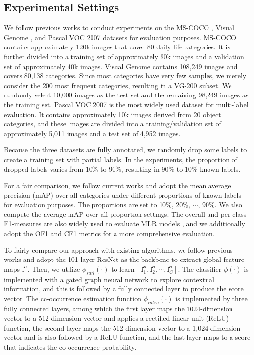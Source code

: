 \subsection{Experimental Settings}

\quad We follow previous works \cite{durand2019learning} to conduct experiments on the MS-COCO \cite{lin2014microsoft}, Visual Genome \cite{krishna2017visual}, and Pascal VOC 2007 \cite{everingham2010pascal} datasets for evaluation purposes. MS-COCO contains approximately 120k images that cover 80 daily life categories. It is further divided into a training set of approximately 80k images and a validation set of approximately 40k images. Visual Genome contains 108,249 images and covers 80,138 categories. Since most categories have very few samples, we merely consider the 200 most frequent categories, resulting in a VG-200 subset. We randomly select 10,000 images as the test set and the remaining 98,249 images as the training set. Pascal VOC 2007 is the most widely used dataset for multi-label evaluation. It contains approximately 10k images derived from 20 object categories, and these images are divided into a training/validation set of approximately 5,011 images and a test set of 4,952 images.

Because the three datasets are fully annotated, we randomly drop some labels to create a training set with partial labels. In the experiments, the proportion of dropped labels varies from 10\% to 90\%, resulting in 90\% to 10\% known labels.

\quad For a fair comparison, we follow current works \cite{durand2019learning,huynh2020interactive} and adopt the mean average precision (mAP) over all categories under different proportions of known labels for evaluation purposes. The proportions are set to 10\%, 20\%, $\cdots$, 90\%. We also compute the average mAP over all proportion settings. The overall and per-class F1-measures are also widely used to evaluate MLR models \cite{chen2019learning}, and we additionally adopt the 
OF1 and CF1 metrics for a more comprehensive evaluation.

\quad To fairly compare our approach with existing algorithms, we follow previous works \cite{durand2019learning,chen2019learning} and adopt the 101-layer ResNet \cite{he2016deep} as the backbone to extract global feature maps $\textbf{f}^n$. Then, we utilize $\phi_{sarl}(\cdot)$ to learn $[\textbf{f}^n_1, \textbf{f}^n_2, \cdots, \textbf{f}^n_C]$. The classifier $\phi(\cdot)$ is implemented with a gated graph neural network to explore contextual information, and this is followed by a fully connected layer to produce the score vector. The co-occurrence estimation function $\phi_{intra}(\cdot)$ is implemented by three fully connected layers, among which the first layer maps the 1024-dimension vector to a 512-dimension vector and applies a rectified linear unit (ReLU) function, the second layer maps the 512-dimension vector to a 1,024-dimension vector and is also followed by a ReLU function, and the last layer maps to a score that indicates the co-occurrence probability.

